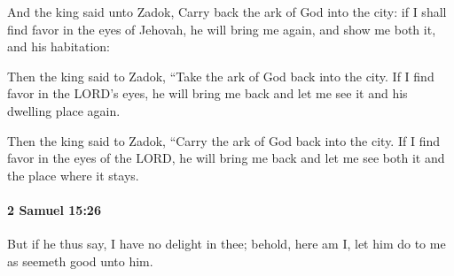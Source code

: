 			\begin{versebox}
					\item[BHS] 
					\item[ASV] And the king said unto Zadok, Carry back the ark of God into the city: if I shall find favor in the eyes of Jehovah, he will bring me again, and show me both it, and his habitation:
					\item[NIV] Then the king said to Zadok, “Take the ark of God back into the city. If I find favor in the LORD’s eyes, he will bring me back and let me see it and his dwelling place again.
					\item[NRSV] Then the king said to Zadok, “Carry the ark of God back into the city. If I find favor in the eyes of the LORD, he will bring me back and let me see both it and the place where it stays.
			\end{versebox}

		\paragraph{2 Samuel 15:26} %
			\label{2SAMUEL-15-26}

			But if he thus say, I have no delight in thee; behold, here am I, let him do to me as seemeth good unto him.

